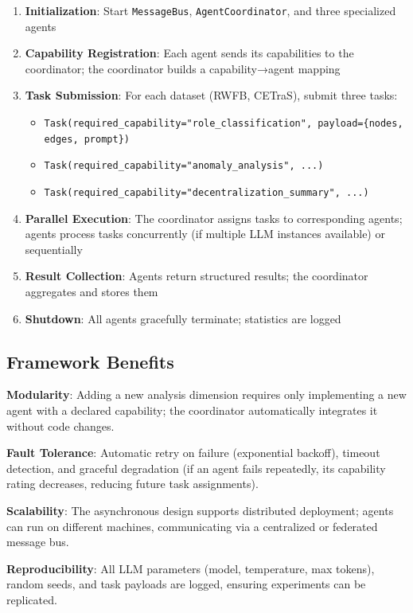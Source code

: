 \begin{enumerate}
    \item \textbf{Initialization}: Start \texttt{MessageBus}, \texttt{AgentCoordinator}, and three specialized agents
    \item \textbf{Capability Registration}: Each agent sends its capabilities to the coordinator; the coordinator builds a capability→agent mapping
    \item \textbf{Task Submission}: For each dataset (RWFB, CETraS), submit three tasks:
    \begin{itemize}
        \item \texttt{Task(required\_capability="role\_classification", payload=\{nodes, edges, prompt\})}
        \item \texttt{Task(required\_capability="anomaly\_analysis", ...)}
        \item \texttt{Task(required\_capability="decentralization\_summary", ...)}
    \end{itemize}
    \item \textbf{Parallel Execution}: The coordinator assigns tasks to corresponding agents; agents process tasks concurrently (if multiple LLM instances available) or sequentially
    \item \textbf{Result Collection}: Agents return structured results; the coordinator aggregates and stores them
    \item \textbf{Shutdown}: All agents gracefully terminate; statistics are logged
\end{enumerate}

\subsection{Framework Benefits}

\textbf{Modularity}: Adding a new analysis dimension requires only implementing a new agent with a declared capability; the coordinator automatically integrates it without code changes.

\textbf{Fault Tolerance}: Automatic retry on failure (exponential backoff), timeout detection, and graceful degradation (if an agent fails repeatedly, its capability rating decreases, reducing future task assignments).

\textbf{Scalability}: The asynchronous design supports distributed deployment; agents can run on different machines, communicating via a centralized or federated message bus.

\textbf{Reproducibility}: All LLM parameters (model, temperature, max tokens), random seeds, and task payloads are logged, ensuring experiments can be replicated.

